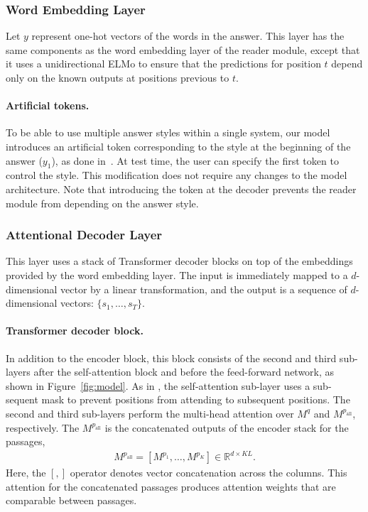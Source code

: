\documentclass[11pt,a4paper]{article}
\theoremstyle{mydef}
\theoremstyle{myprob}
\begin{document}
\subsubsection{Word Embedding Layer}

Let $y$ represent one-hot vectors of the words in the answer. This layer has the same components as the word embedding layer of the reader module, except that it uses a unidirectional ELMo to ensure that the predictions for position $t$ depend only on the known outputs at positions previous to $t$.

\paragraph{Artificial tokens.} 
To be able to use multiple answer styles within a single system, our model introduces an artificial token corresponding to the style at the beginning of the answer ($y_1$), as done in~\citep{JohnsonSLKWCTVW17,TakenoNY17}.
At test time, the user can specify the first token to control the style. This modification does not require any changes to the model architecture.  Note that introducing the token at the decoder prevents the reader module from depending on the answer style.

\subsubsection{Attentional Decoder Layer}
\label{sec:style}

This layer uses a stack of Transformer decoder blocks on top of the embeddings provided by the word embedding layer. The input is immediately mapped to a $d$-dimensional vector by a linear transformation, and the output is a sequence of $d$-dimensional vectors: $\{s_1, \ldots, s_T\}$.

\paragraph{Transformer decoder block.} 
In addition to the encoder block, this block consists of the second and third sub-layers after the self-attention block and before the feed-forward network, as shown in Figure~\ref{fig:model}. As in \citep{VaswaniSPUJGKP17}, the self-attention sub-layer uses a sub-sequent mask to prevent positions from attending to subsequent positions. The second and third sub-layers perform the multi-head attention over $M^q$ and $M^{p_\mathrm{all}}$, respectively. 
The $M^{p_\mathrm{all}}$ is the concatenated outputs of the encoder stack for the passages, 
\begin{align}
\nonumber
M^{p_\mathrm{all}} = [M^{p_1}, \ldots, M^{p_K}] \in \mathbb{R}^{d \times KL}.
\end{align}
Here, the $[,]$ operator denotes vector concatenation across the columns. 
This attention for the concatenated passages produces attention weights that are comparable between passages.
\end{document}
